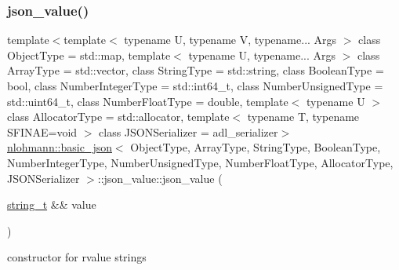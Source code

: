 \subsubsection{\texorpdfstring{json\+\_\+value()}{json\_value()}\hspace{0.1cm}{\footnotesize\ttfamily [8/12]}}
{\footnotesize\ttfamily template$<$template$<$ typename U, typename V, typename... Args $>$ class Object\+Type = std\+::map, template$<$ typename U, typename... Args $>$ class Array\+Type = std\+::vector, class String\+Type  = std\+::string, class Boolean\+Type  = bool, class Number\+Integer\+Type  = std\+::int64\+\_\+t, class Number\+Unsigned\+Type  = std\+::uint64\+\_\+t, class Number\+Float\+Type  = double, template$<$ typename U $>$ class Allocator\+Type = std\+::allocator, template$<$ typename T, typename S\+F\+I\+N\+A\+E=void $>$ class J\+S\+O\+N\+Serializer = adl\+\_\+serializer$>$ \\
\hyperlink{classnlohmann_1_1basic__json}{nlohmann\+::basic\+\_\+json}$<$ Object\+Type, Array\+Type, String\+Type, Boolean\+Type, Number\+Integer\+Type, Number\+Unsigned\+Type, Number\+Float\+Type, Allocator\+Type, J\+S\+O\+N\+Serializer $>$\+::json\+\_\+value\+::json\+\_\+value (\begin{DoxyParamCaption}\item[{\hyperlink{classnlohmann_1_1basic__json_a61f8566a1a85a424c7266fb531dca005}{string\+\_\+t} \&\&}]{value }\end{DoxyParamCaption})\hspace{0.3cm}{\ttfamily [inline]}}



constructor for rvalue strings 

\mbox{\label{unionnlohmann_1_1basic__json_1_1json__value_a74330ab1bc8ce1d0c6e2ee711c150563}} 
